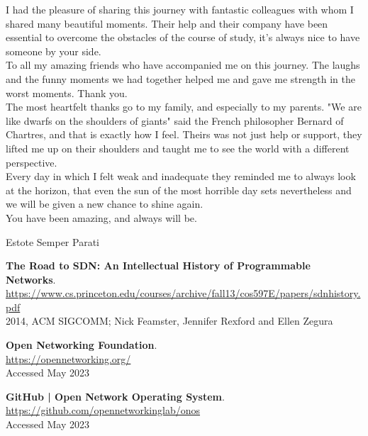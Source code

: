 \documentclass[a4paper,10pt]{memoir}
\begin{document}
{I had the pleasure of sharing this journey with fantastic colleagues with whom I shared many beautiful moments. Their help and their company have been essential to overcome the obstacles of the course of study, it's always nice to have someone by your side.\\

To all my amazing friends who have accompanied me on this journey. The laughs and the funny moments we had together helped me and gave me strength in the worst moments. Thank you.\\

The most heartfelt thanks go to my family, and especially to my parents. 
"We are like dwarfs on the shoulders of giants" said the French philosopher Bernard of Chartres, and that is exactly how I feel. 
Theirs was not just help or support, they lifted me up on their shoulders and taught me to see the world with a different perspective.\\
Every day in which I felt weak and inadequate they reminded me to always look at the horizon, that even the sun of the most horrible day sets nevertheless and we will be given a new chance to shine again.\\
You have been amazing, and always will be.\\

\bigskip

Estote Semper Parati



\begin{thebibliography}{9}

  \textbf{The Road to SDN: An Intellectual History of Programmable Networks}.\\
  \href{https://www.cs.princeton.edu/courses/archive/fall13/cos597E/papers/sdnhistory.pdf}{https://www.cs.princeton.edu/courses/archive/fall13/cos597E/papers/sdnhistory.pdf}\\
  2014, ACM SIGCOMM; Nick Feamster, Jennifer Rexford and Ellen Zegura

  \textbf{Open Networking Foundation}.\\
  \href{https://opennetworking.org/}{https://opennetworking.org/}\\
  Accessed May 2023

  \textbf{GitHub | Open Network Operating System}.\\
  \href{https://github.com/opennetworkinglab/onos}{https://github.com/opennetworkinglab/onos}\\
  Accessed May 2023


\end{thebibliography}}
\end{document}
